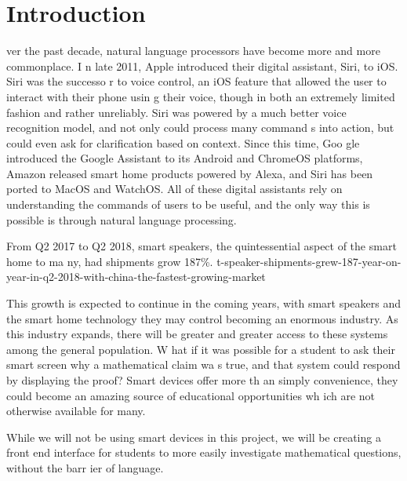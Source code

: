 \chapter{Introduction}\label{intro}
ver the past decade, natural language processors have become more and more commonplace. I
n late 2011, Apple introduced their digital assistant, Siri, to iOS. Siri was the successo
r to voice control, an iOS feature that allowed the user to interact with their phone usin
g their voice, though in both an extremely limited fashion and rather unreliably. Siri was
 powered by a much better voice recognition model, and not only could process many command
s into action, but could even ask for clarification based on context. Since this time, Goo
gle introduced the Google Assistant to its Android and ChromeOS platforms, Amazon released
 smart home products powered by Alexa, and Siri has been ported to MacOS and WatchOS. All 
of these digital assistants rely on understanding the commands of users to be useful, and 
the only way this is possible is through natural language processing.                     
                                                                                          
From Q2 2017 to Q2 2018, smart speakers, the quintessential aspect of the smart home to ma
ny, had shipments grow 187\%. \cite{canalys} %
t-speaker-shipments-grew-187-year-on-year-in-q2-2018-with-china-the-fastest-growing-market
                                                                                          
This growth is expected to continue in the coming years, with smart speakers and the smart
 home technology they may control becoming an enormous industry. As this industry expands,
 there will be greater and greater access to these systems among the general population. W
hat if it was possible for a student to ask their smart screen why a mathematical claim wa
s true, and that system could respond by displaying the proof? Smart devices offer more th
an simply convenience, they could become an amazing source of educational opportunities wh
ich are not otherwise available for many.                                                 
                                                                                          
While we will not be using smart devices in this project, we will be creating a front end 
interface for students to more easily investigate mathematical questions, without the barr
ier of language.                                                                          
                                                                                          
